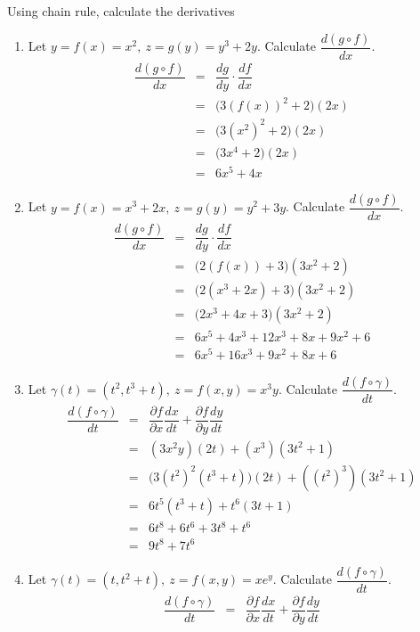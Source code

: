 \documentclass[a4paper,10pt]{article}
\begin{document}
Using chain rule, calculate the derivatives
\begin{enumerate}
	\item Let $ y = f(x) = x^2, \ z = g(y) = y^3 + 2y $. Calculate $ \dfrac{d(g \circ f)}{dx} $.
	\begin{eqnarray} \nonumber
	\dfrac{d(g \circ f)}{dx} &=& \dfrac{dg}{dy} \cdot \dfrac{df}{dx} \\ \nonumber
	&=& \big(3(f(x))^2+2\big)(2x) \\ \nonumber
	&=& \big(3(x^2)^2+2\big)(2x) \\ \nonumber
	&=& \big(3x^4+2\big)(2x) \\ \nonumber
	&=& 6x^5+4x
	\end{eqnarray}
	\item Let $ y = f(x) = x^3+2x, \ z = g(y) = y^2+3y $. Calculate $ \dfrac{d(g \circ f)}{dx} $.
	\begin{eqnarray} \nonumber
	\dfrac{d(g \circ f)}{dx} &=& \dfrac{dg}{dy} \cdot \dfrac{df}{dx} \\ \nonumber
	&=& \big(2(f(x))+3\big)(3x^2+2) \\ \nonumber
	&=& \big(2(x^3+2x)+3\big)(3x^2+2) \\ \nonumber
	&=& \big(2x^3 + 4x + 3\big)(3x^2+2) \\ \nonumber
	&=& 6x^5 + 4x^3 + 12x^3 + 8x + 9x^2 + 6 \\ \nonumber
	&=& 6x^5 + 16x^3 + 9x^2 + 8x +6
	\end{eqnarray}
	\item Let $ \gamma(t) = (t^2, t^3+t), \ z = f(x,y) = x^3y $. Calculate $ \dfrac{d(f \circ \gamma)}{dt} $.
	\begin{eqnarray} \nonumber
	\dfrac{d(f \circ \gamma)}{dt} &=& \dfrac{\partial f}{\partial x}\dfrac{dx}{dt} +  \dfrac{\partial f}{\partial y}\dfrac{dy}{dt} \\ \nonumber
	&=& (3x^2y)(2t) + (x^3)(3t^2+1) \\ \nonumber
	&=& \big( 3(t^2)^2(t^3+t) \big) (2t) + ((t^2)^3)(3t^2+1) \\ \nonumber
	&=& 6t^5 (t^3+t) + t^6 (3t+1) \\ \nonumber
	&=& 6t^8 + 6t^6 + 3t^8 + t^6 \\ \nonumber
	&=& 9t^8 + 7t^6
	\end{eqnarray}
	\item Let $ \gamma(t) = (t, t^2+t), \ z = f(x,y) = xe^y $. Calculate $ \dfrac{d(f \circ \gamma)}{dt} $.
	\begin{eqnarray}\nonumber
	\dfrac{d(f \circ \gamma)}{dt} &=& \dfrac{\partial f}{ \partial x}\dfrac{dx}{dt} +  \dfrac{\partial f}{\partial y}\dfrac{dy}{dt} \\ \nonumber

\end{eqnarray}
\end{enumerate}
\end{document}
